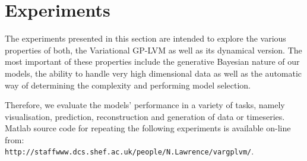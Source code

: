 
\section{\label{section:experiments} Experiments}

The experiments presented in this section are intended to explore the various properties of both, the Variational
GP-LVM as well as its dynamical version. The most important of these properties include the generative Bayesian
nature of our models, the ability to handle very high dimensional data as well as the automatic way of determining
the complexity and performing model selection.

Therefore, we evaluate the models' performance in a variety of tasks, namely
visualisation, prediction, reconstruction and generation of data or timeseries.
Matlab source code for repeating the following experiments is available
on-line from: \\
\verb|http://staffwww.dcs.shef.ac.uk/people/N.Lawrence/vargplvm/|.

